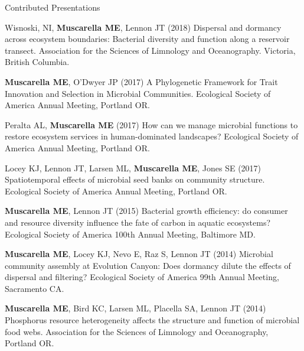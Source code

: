 \documentclass{resume} %
\begin{document}

\begin{rSection}{Contributed Presentations}

  Wisnoski, NI, {\bf Muscarella ME}, Lennon JT (2018) Dispersal and dormancy
  across ecosystem boundaries: Bacterial diversity and function along a
  reservoir transect. Association for the Sciences of Limnology and
  Oceanography. Victoria, British Columbia.

  {\bf Muscarella ME}, O'Dwyer JP (2017) A Phylogenetic Framework for Trait
   Innovation and Selection in Microbial Communities.
   Ecological Society of America Annual Meeting, Portland OR.

  Peralta AL, {\bf Muscarella ME} (2017) How can we manage microbial functions
  to restore ecosystem services in human-dominated landscapes?
  Ecological Society of America Annual Meeting, Portland OR.

  Locey KJ, Lennon JT, Larsen ML, {\bf Muscarella ME}, Jones SE (2017)
  Spatiotemporal effects of microbial seed banks on community structure.
  Ecological Society of America Annual Meeting, Portland OR.

  {\bf Muscarella ME}, Lennon JT (2015) Bacterial growth efficiency: do
  consumer and resource diversity influence the fate of carbon in aquatic
  ecosystems? Ecological Society of America 100th Annual Meeting, Baltimore MD.

  {\bf Muscarella ME}, Locey KJ, Nevo E, Raz S, Lennon JT (2014) Microbial
  community assembly at Evolution Canyon: Does dormancy dilute the effects of
  dispersal and filtering? Ecological Society of America 99th Annual Meeting,
  Sacramento CA.

  {\bf Muscarella ME}, Bird KC, Larsen ML, Placella SA, Lennon JT (2014)
  Phosphorus resource heterogeneity affects the structure and function of
  microbial food webs. Association for the Sciences of Limnology and
  Oceanography, Portland OR.


\end{rSection}
\end{document}
